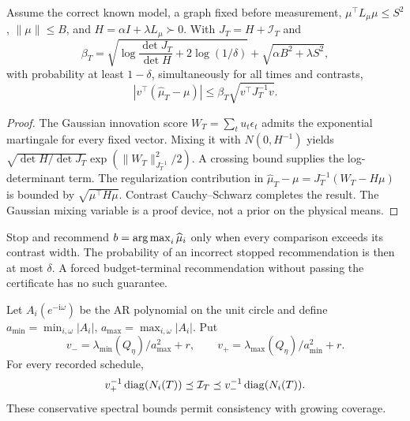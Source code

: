 \begin{theorem}
Assume the correct known model, a graph fixed before measurement, $\mu^\top L_\mu\mu\le S^2$, $\|\mu\|\le B$, and $H=\alpha I+\lambda L_\mu\succ0$. With $J_T=H+\mathcal I_T$ and
\begin{equation}
\beta_T=\sqrt{\log\frac{\det J_T}{\det H}+2\log(1/\delta)}
+\sqrt{\alpha B^2+\lambda S^2},
\end{equation}
with probability at least $1-\delta$, simultaneously for all times and contrasts,
\begin{equation}
|v^\top(\widehat\mu_T-\mu)|\le\beta_T\sqrt{v^\top J_T^{-1}v}.
\end{equation}
\end{theorem}
\begin{proof}
The Gaussian innovation score $W_T=\sum_tu_t\epsilon_t$ admits the exponential martingale for every fixed vector. Mixing it with $N(0,H^{-1})$ yields
$\sqrt{\det H/\det J_T}\exp(\|W_T\|_{J_T^{-1}}^2/2)$. A crossing bound supplies the log-determinant term. The regularization contribution in $\widehat\mu_T-\mu=J_T^{-1}(W_T-H\mu)$ is bounded by $\sqrt{\mu^\top H\mu}$. Contrast Cauchy--Schwarz completes the result. The Gaussian mixing variable is a proof device, not a prior on the physical means.
\end{proof}

Stop and recommend $b=\operatorname*{arg\,max}_i\widehat\mu_i$ only when every comparison exceeds its contrast width. The probability of an incorrect stopped recommendation is then at most $\delta$. A forced budget-terminal recommendation without passing the certificate has no such guarantee.

Let $A_i(e^{-\mathrm i\omega})$ be the AR polynomial on the unit circle and define
$a_{\min}=\min_{i,\omega}|A_i|$, $a_{\max}=\max_{i,\omega}|A_i|$. Put
\begin{equation}
v_-={\lambda_{\min}(Q_\eta)}/{a_{\max}^2}+r,
\qquad v_+={\lambda_{\max}(Q_\eta)}/{a_{\min}^2}+r.
\end{equation}
For every recorded schedule,
\begin{equation}
v_+^{-1}\operatorname{diag}(N_i(T))\preceq\mathcal I_T\preceq v_-^{-1}\operatorname{diag}(N_i(T)).
\end{equation}
These conservative spectral bounds permit consistency with growing coverage.


